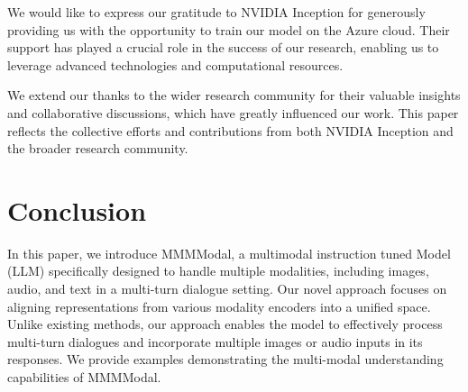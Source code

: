 \documentclass[preprint]{article}
\begin{document}
We would like to express our gratitude to NVIDIA Inception for generously providing us with the opportunity to train our model on the Azure cloud. Their support has played a crucial role in the success of our research, enabling us to leverage advanced technologies and computational resources.

We extend our thanks to the wider research community for their valuable insights and collaborative discussions, which have greatly influenced our work. This paper reflects the collective efforts and contributions from both NVIDIA Inception and the broader research community.


\section{Conclusion}

In this paper, we introduce MMMModal, a multimodal instruction tuned Model (LLM) specifically designed to handle multiple modalities, including images, audio, and text in a multi-turn dialogue setting. Our novel approach focuses on aligning representations from various modality encoders into a unified space. Unlike existing methods, our approach enables the model to effectively process multi-turn dialogues and incorporate multiple images or audio inputs in its responses. We provide examples demonstrating the multi-modal understanding capabilities of MMMModal.

{}

\end{document}

